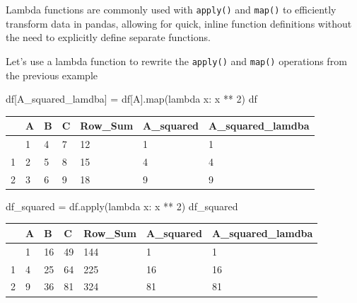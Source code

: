 \documentclass[
  letterpaper,
  DIV=11,
  numbers=noendperiod]{scrreprt}
\newenvironment{Shaded}{\begin{snugshade}}{\end{snugshade}}
\newcommand{\BuiltInTok}[1]{\textcolor[rgb]{0.00,0.23,0.31}{#1}}
\newcommand{\DecValTok}[1]{\textcolor[rgb]{0.68,0.00,0.00}{#1}}
\newcommand{\KeywordTok}[1]{\textcolor[rgb]{0.00,0.23,0.31}{#1}}
\newcommand{\NormalTok}[1]{\textcolor[rgb]{0.00,0.23,0.31}{#1}}
\newcommand{\OperatorTok}[1]{\textcolor[rgb]{0.37,0.37,0.37}{#1}}
\newcommand{\StringTok}[1]{\textcolor[rgb]{0.13,0.47,0.30}{#1}}
\begin{document}
Lambda functions are commonly used with \texttt{apply()} and
\texttt{map()} to efficiently transform data in pandas, allowing for
quick, inline function definitions without the need to explicitly define
separate functions.

Let's use a lambda function to rewrite the \texttt{apply()} and
\texttt{map()} operations from the previous example

\begin{Shaded}
\begin{Highlighting}[]
\NormalTok{df[}\StringTok{\textquotesingle{}A\_squared\_lamdba\textquotesingle{}}\NormalTok{] }\OperatorTok{=}\NormalTok{ df[}\StringTok{\textquotesingle{}A\textquotesingle{}}\NormalTok{].}\BuiltInTok{map}\NormalTok{(}\KeywordTok{lambda}\NormalTok{ x: x }\OperatorTok{**} \DecValTok{2}\NormalTok{)}
\NormalTok{df}
\end{Highlighting}
\end{Shaded}

\begin{longtable}[]{@{}lllllll@{}}
\toprule\noalign{}
& A & B & C & Row\_Sum & A\_squared & A\_squared\_lamdba \\
\midrule\noalign{}
\endhead
\bottomrule\noalign{}
\endlastfoot
0 & 1 & 4 & 7 & 12 & 1 & 1 \\
1 & 2 & 5 & 8 & 15 & 4 & 4 \\
2 & 3 & 6 & 9 & 18 & 9 & 9 \\
\end{longtable}

\begin{Shaded}
\begin{Highlighting}[]
\NormalTok{df\_squared }\OperatorTok{=}\NormalTok{ df.}\BuiltInTok{apply}\NormalTok{(}\KeywordTok{lambda}\NormalTok{ x: x }\OperatorTok{**} \DecValTok{2}\NormalTok{)}
\NormalTok{df\_squared}
\end{Highlighting}
\end{Shaded}

\begin{longtable}[]{@{}lllllll@{}}
\toprule\noalign{}
& A & B & C & Row\_Sum & A\_squared & A\_squared\_lamdba \\
\midrule\noalign{}
\endhead
\bottomrule\noalign{}
\endlastfoot
0 & 1 & 16 & 49 & 144 & 1 & 1 \\
1 & 4 & 25 & 64 & 225 & 16 & 16 \\
2 & 9 & 36 & 81 & 324 & 81 & 81 \\
\end{longtable}
\end{document}
